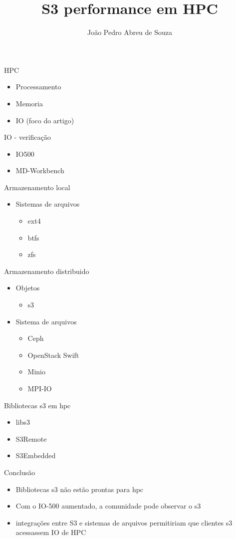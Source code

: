 \documentclass{beamer}
\title{S3 performance em HPC}
\author{João Pedro Abreu de Souza}
\begin{document}
\begin{frame}[plain]
    \maketitle
\end{frame}
\begin{frame}{HPC}
	\begin{itemize}
		\item Processamento
		\pause
		\item Memoria
		\pause
		\item IO (foco do artigo)
	\end{itemize}
\end{frame}
\begin{frame}{IO - verificação}
	\begin{itemize}
		\item IO500
		\item MD-Workbench
	\end{itemize}
\end{frame}
\begin{frame}{Armazenamento local}
	\begin{itemize}
		\item Sistemas de arquivos
		\begin{itemize}
			\item ext4
			\item btfs
			\item zfs
		\end{itemize}
	\end{itemize}
\end{frame}
\begin{frame}{Armazenamento distribuido}
	\begin{itemize}
		\item Objetos
\begin{itemize}
	\item s3
\end{itemize}
		\item Sistema de arquivos
		\begin{itemize}
			\item Ceph
			\item OpenStack Swift
			\item Minio
			\item MPI-IO
		\end{itemize}
		\end{itemize}
\end{frame}
\begin{frame}{Bibliotecas s3 em hpc}
	\begin{itemize}
		\item libs3
		\item S3Remote
		\item S3Embedded
	\end{itemize}
\end{frame}
\begin{frame}{Conclusão}
	\begin{itemize}
		\item Bibliotecas s3 não estão prontas para hpc
		\item Com o IO-500 aumentado, a comunidade pode observar o s3
		\item integrações entre S3 e sistemas de arquivos permitiriam que clientes s3 acessassem IO de HPC
	\end{itemize}
\end{frame}
\end{document}
